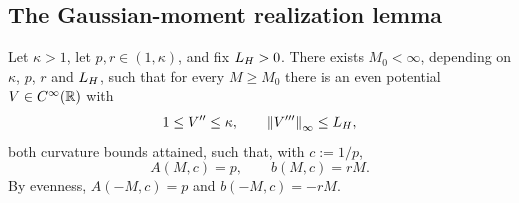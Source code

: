 \subsection{The Gaussian-moment realization lemma}

\begin{lemma}\label{lem:cycle-moments}
    Let $\kappa>1$, let $p,r\in(1,\kappa)$, and fix $L_H>0$. There exists
    $M_0<\infty$, depending on $\kappa$, $p$, $r$ and $L_H$, such that for every $M\geq M_0$
    there is an even potential $V\in C^\infty(\mathbb{R})$ with
    \begin{equation}\label{eq:cycle-regularity}
        1\leq V''\leq\kappa,
        \qquad
        \left\lVert V'''\right\rVert_\infty\leq L_H,
    \end{equation}
    both curvature bounds attained, such that, with $c:=1/p$,
    \begin{equation}\label{eq:cycle-identities}
        A(M,c)=p,
        \qquad
        b(M,c)=rM .
    \end{equation}
    By evenness, $A(-M,c)=p$ and $b(-M,c)=-rM$.
\end{lemma}

